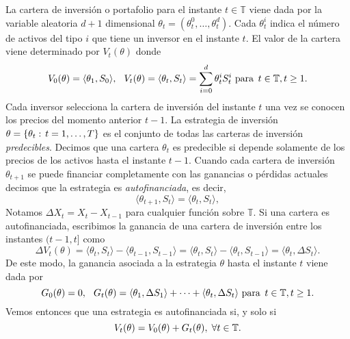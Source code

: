 La cartera de inversión o portafolio para el instante $ t \in \mathbb{T} $ viene dada por la variable aleatoria $ d+1 $ dimensional $ \theta_t = (\theta_t^0,\dots,\theta_t^d) $. Cada $ \theta_t^i $ indica el número de activos del tipo $ i $ que tiene un inversor en el instante $ t $. El valor de la cartera viene determinado por $ V_t(\theta) $ donde
\[
V_0(\theta) = \langle \theta_1 , S_0\rangle, \hspace{2.5mm} V_t(\theta) = \langle \theta_t , S_t\rangle = \sum_{i=0}^{d} \theta_t^i S_t^i \text{ para } \hspace{0.5mm} t \in \mathbb{T}, t \geq 1.
\]
Cada inversor selecciona la cartera de inversión del instante $ t $ una vez se conocen los precios del momento anterior $ t-1 $. La estrategia de inversión $ \theta = \{\theta_t: \hspace{0.5mm}t=1,\dots,T\} $ es el conjunto de todas las carteras de inversión \textit{predecibles}. Decimos que una cartera $ \theta_{t} $ es predecible si depende solamente de los precios de los activos hasta el instante $ t-1 $. Cuando cada cartera de inversión $ \theta_{t+1} $ se puede financiar completamente con las ganancias o pérdidas actuales decimos que la estrategia es \textit{autofinanciada}, es decir, 
\begin{equation*}\label{selfinance}
\langle \theta_{t+1}, S_t \rangle = \langle \theta_{t}, S_t \rangle,
\end{equation*} Notamos $ \Delta X_t = X_t - X_{t-1} $ para cualquier función sobre $ \mathbb{T} $. Si una cartera es autofinanciada, escribimos la ganancia de una cartera de inversión entre los instantes $ (t-1,t] $ como 
\[
\Delta V_t(\theta) = \langle\theta_t, S_t \rangle - \langle\theta_{t-1}, S_{t-1}\rangle = \langle\theta_t, S_t \rangle - \langle\theta_{t}, S_{t-1}\rangle = \langle\theta_{t}, \Delta S_{t}\rangle.
\]
De este modo, la ganancia asociada a la estrategia $ \theta $ hasta el instante $ t $ viene dada por
\[
G_0(\theta) = 0, \hspace{2.5mm} G_t(\theta) = \langle\theta_{1}, \Delta S_{1}\rangle + \cdots + \langle\theta_{t}, \Delta S_{t}\rangle \text{ para } \hspace{0.5mm} t \in \mathbb{T}, t \geq 1.
\]
Vemos entonces que una estrategia es autofinanciada si, y solo si
\begin{equation}\label{selfinifonlyif}
V_t(\theta) = V_0(\theta) + G_t(\theta), \hspace{1mm} \forall t \in \mathbb{T}.
\end{equation}

